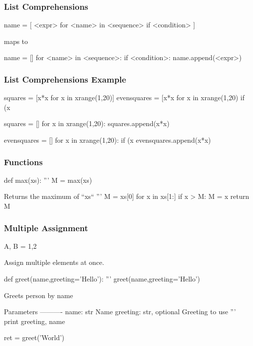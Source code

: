 \begin{frame}[fragile]
\frametitle{List Comprehensions}

\begin{python}
name = [ <expr> for <name> in <sequence> if <condition> ]
\end{python}

maps to

\begin{python}
name = []
for <name> in <sequence>:
    if <condition>:
        name.append(<expr>)
\end{python}

\end{frame}

\begin{frame}[fragile]
\frametitle{List Comprehensions Example}

\begin{python}
squares = [x*x for x in xrange(1,20)]
evensquares = [x*x for x in xrange(1,20) if (x%
\end{python}

\begin{python}
squares = []
for x in xrange(1,20):
    squares.append(x*x)

evensquares = []
for x in xrange(1,20):
    if (x%
        evensquares.append(x*x)
\end{python}

\end{frame}

\begin{frame}[fragile]
\frametitle{Functions}

\begin{python}
def max(xs):
    '''
    M = max(xs)

    Returns the maximum of ``xs``
    '''
    M = xs[0]
    for x in xs[1:]
        if x > M:
            M = x
    return M
\end{python}

\end{frame}


\begin{frame}[fragile]
\frametitle{Multiple Assignment}

\begin{python}
A, B = 1,2
\end{python}

Assign multiple elements at once.
\end{frame}

\begin{frame}[fragile]

\begin{python}
def greet(name,greeting='Hello'):
    '''
    greet(name,greeting='Hello')

    Greets person by name

    Parameters
    ----------
    name: str
        Name
    greeting: str, optional
        Greeting to use
    '''
    print greeting, name

ret = greet('World')

\end{python}

\end{frame}

